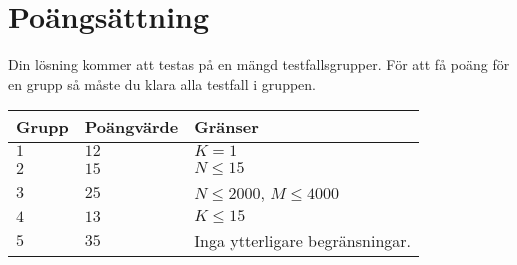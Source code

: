 \section*{Poängsättning}
Din lösning kommer att testas på en mängd testfallsgrupper.
För att få poäng för en grupp så måste du klara alla testfall i gruppen.

\noindent
\begin{tabular}{| l | l | l |}
  \hline
  Grupp & Poängvärde & Gränser \\ \hline
  $1$    & $12$        &  $K=1$ \\ \hline 
  $2$    & $15$        &  $N \leq 15$ \\ \hline
  $3$    & $25$        &  $N \leq 2000$, $M \leq 4000$ \\ \hline
  $4$    & $13$        &  $K \leq 15$ \\ \hline 
  $5$    & $35$       &  Inga ytterligare begränsningar. \\ \hline
\end{tabular}
